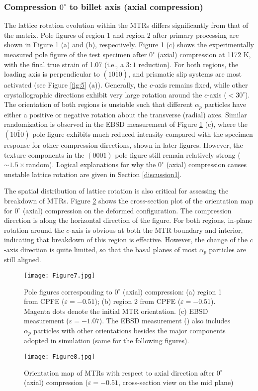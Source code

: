 \documentclass[review]{elsarticle}
\begin{document}
		\subsubsection{Compression \texorpdfstring{$0^{\circ}$}{TEXT} to billet axis (axial compression)}
		The lattice rotation evolution within the MTRs differs significantly from that of the matrix.
		Pole figures of region 1 and region 2 after primary processing are shown in Figure \ref{fig:7} (a) and (b), respectively.
		Figure \ref{fig:7} (c) shows the experimentally measured pole figure of the test specimen after $0^{\circ}$ (axial) compression at 1172 K, with the final true strain of 1.07 (i.e., a $3:1$ reduction).
		For both regions, the loading axis is perpendicular to $(10\bar{1}0)$, and prismatic slip systems are most activated (see Figure \ref{fig:5} (a)).
		Generally, the $c$-axis remains fixed, while other crystallographic directions exhibit very large rotation around the $c$-axis ($<30^{\circ}$).
		The orientation of both regions is unstable such that different $\alpha_p$ particles have either a positive or negative rotation about the transverse (radial) axes.
		Similar randomization is observed in the EBSD measurement of Figure \ref{fig:7} (c), where the $(10\bar{1}0)$ pole figure exhibits much reduced intensity compared with the specimen response for other compression directions, shown in later figures.
		However, the texture components in the $(0001)$ pole figure still remain relatively strong ($\sim 1.5 \times$random).
		Logical explanations for why the $0^{\circ}$ (axial) compression causes unstable lattice rotation are given in Section \ref{discussion1}.
		
		The spatial distribution of lattice rotation is also critical for assessing the breakdown of MTRs.
		Figure \ref{fig:10} shows the cross-section plot of the orientation map for $0^{\circ}$ (axial) compression on the deformed configuration.
		The compression direction is along the horizontal direction of the figure.
		For both regions, in-plane rotation around the $c$-axis is obvious at both the MTR boundary and interior, indicating that breakdown of this region is effective.
		However, the change of the $c$-axis direction is quite limited, so that the basal planes of most $\alpha_p$ particles are still aligned.
		\begin{figure}[!htb]
		\centering
		\texttt{[image: Figure7.jpg]}
		\caption{\label{fig:7}Pole figures corresponding to $0^{\circ}$ (axial) compression: (a) region 1 from CPFE ($\varepsilon =-0.51$);
            (b) region 2 from CPFE ($\varepsilon =-0.51$).
            Magenta dots denote the initial MTR orientation.
            (c) EBSD measurement ($\varepsilon =-1.07$).
            The EBSD measurement (\cite{r26}) also includes $\alpha_p$ particles with other orientations besides the major components adopted in simulation (same for the following figures).}
		\end{figure}
		\begin{figure}[!htb]
		\centering
		\texttt{[image: Figure8.jpg]}
		\caption{\label{fig:10}Orientation map of MTRs with respect to axial direction after $0^{\circ}$ (axial) compression ($\varepsilon=-0.51$, cross-section view on the mid plane)}
		\end{figure}
\end{document}

